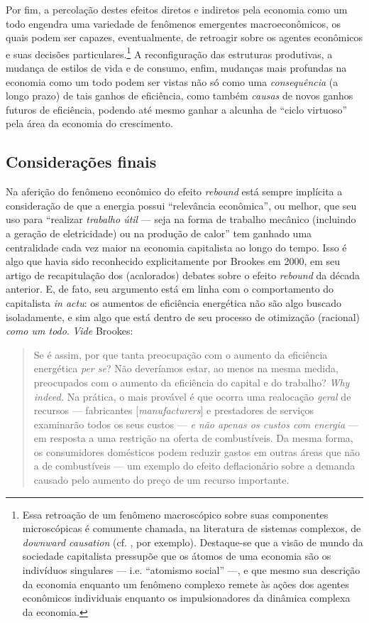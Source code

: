 Por fim, a percolação destes efeitos diretos e indiretos pela economia como um todo engendra uma variedade de fenômenos emergentes macroeconômicos, os quais podem ser capazes, eventualmente, de retroagir sobre os agentes econômicos e suas decisões particulares.\footnote{Essa retroação de um fenômeno macroscópico sobre suas componentes microscópicas é comumente chamada, na literatura de sistemas complexos, de \textit{downward causation} (cf. \textcite{Kim2006}, por exemplo). Destaque-se que a visão de mundo da sociedade capitalista pressupõe que os átomos de uma economia são os indivíduos singulares --- i.e. ``atomismo social'' \parencite{Medeiros2013} ---, e que mesmo sua descrição da economia enquanto um fenômeno complexo remete às ações dos agentes econômicos individuais enquanto os impulsionadores da dinâmica complexa da economia.} A reconfiguração das estruturas produtivas, a mudança de estilos de vida e de consumo, enfim, mudanças mais profundas na economia como um todo podem ser vistas não só como uma \textit{consequência} (a longo prazo) de tais ganhos de eficiência, como também \textit{causas} de novos ganhos futuros de eficiência, podendo até mesmo ganhar a alcunha de ``ciclo virtuoso'' pela área da economia do crescimento.


\subsection{Considerações finais}
Na aferição do fenômeno econômico do efeito \textit{rebound} está sempre implícita a consideração de que a energia possui ``relevância econômica'', ou melhor, que seu uso para ``realizar \textit{trabalho útil} --- seja na forma de trabalho mecânico (incluindo a geração de eletricidade) ou na produção de calor'' \parencite[p. 1460]{Sorrell2009} tem ganhado uma centralidade cada vez maior na economia capitalista ao longo do tempo. Isso é algo que havia sido reconhecido explicitamente por Brookes em 2000, em seu artigo de recapitulação dos (acalorados) debates sobre o efeito \textit{rebound} da década anterior. E, de fato, seu argumento está em linha com o comportamento do capitalista \textit{in actu}: os aumentos de eficiência energética não são algo buscado isoladamente, e sim algo que está dentro de seu processo de otimização (racional) \textit{como um todo}. \textit{Vide} Brookes:
\begin{quote}
    Se é assim, por que tanta preocupação com o aumento da eficiência energética \textit{per se}? Não deveríamos estar, ao menos na mesma medida, preocupados com o aumento da eficiência do capital e do trabalho? \textit{Why indeed.} Na prática, o mais provável é que ocorra uma realocação \textit{geral} de recursos --- fabricantes [\textit{manufacturers}] e prestadores de serviços examinarão todos os seus custos --- \textit{e não apenas os custos com energia} --- em resposta a uma restrição na oferta de combustíveis. Da mesma forma, os consumidores domésticos podem reduzir gastos em outras áreas que não a de combustíveis --- um exemplo do efeito deflacionário sobre a demanda causado pelo aumento do preço de um recurso importante. \parencite[p. 356, grifo meu]{Brookes2000}
\end{quote}

